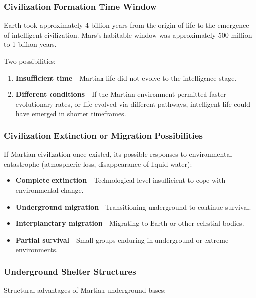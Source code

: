 \documentclass[aps,prd,twocolumn,superscriptaddress,nofootinbib]{revtex4-2}
\begin{document}
\subsubsection{Civilization Formation Time Window}\label{sec:mars-window}

Earth took approximately 4 billion years from the origin of life to the emergence of intelligent civilization. Mars's habitable window was approximately 500 million to 1 billion years.

Two possibilities:

\begin{enumerate}
  \item \textbf{Insufficient time}---Martian life did not evolve to the intelligence stage.
  \item \textbf{Different conditions}---If the Martian environment permitted faster evolutionary rates, or life evolved via different pathways, intelligent life could have emerged in shorter timeframes.
\end{enumerate}

\subsubsection{Civilization Extinction or Migration Possibilities}\label{sec:mars-extinction}

If Martian civilization once existed, its possible responses to environmental catastrophe (atmospheric loss, disappearance of liquid water):

\begin{itemize}
  \item \textbf{Complete extinction}---Technological level insufficient to cope with environmental change.
  \item \textbf{Underground migration}---Transitioning underground to continue survival.
  \item \textbf{Interplanetary migration}---Migrating to Earth or other celestial bodies.
  \item \textbf{Partial survival}---Small groups enduring in underground or extreme environments.
\end{itemize}

\subsubsection{Underground Shelter Structures}\label{sec:mars-underground}

Structural advantages of Martian underground bases:
\end{document}
